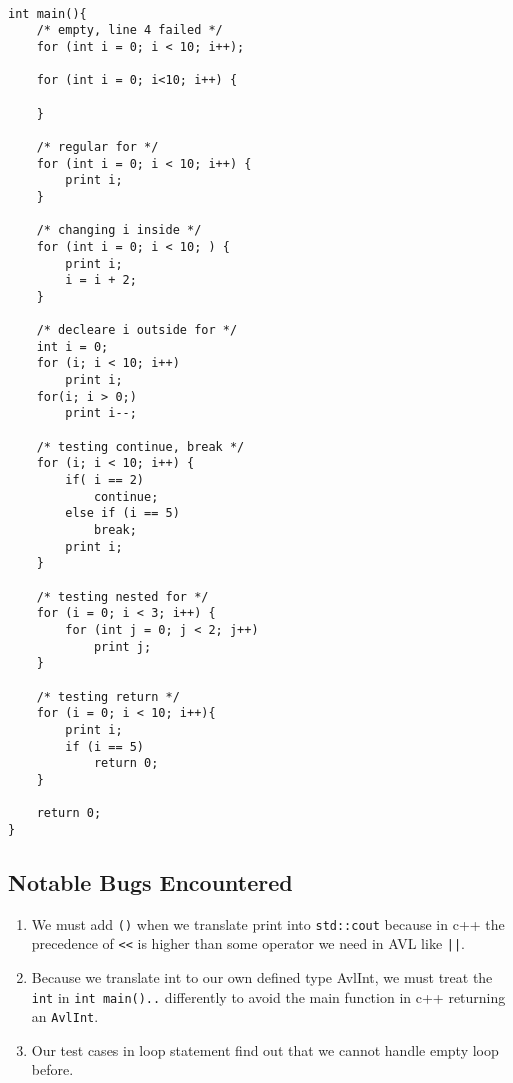 \begin{verbatim}

int main(){
    /* empty, line 4 failed */
    for (int i = 0; i < 10; i++);

    for (int i = 0; i<10; i++) {

    }

    /* regular for */
    for (int i = 0; i < 10; i++) {
        print i;
    }

    /* changing i inside */
    for (int i = 0; i < 10; ) {
        print i;
        i = i + 2;
    }

    /* decleare i outside for */
    int i = 0;
    for (i; i < 10; i++)
        print i;
    for(i; i > 0;)
        print i--;

    /* testing continue, break */
    for (i; i < 10; i++) {
        if( i == 2)
            continue;
        else if (i == 5)
            break;
        print i;
    }

    /* testing nested for */
    for (i = 0; i < 3; i++) {
        for (int j = 0; j < 2; j++)
            print j;
    }

    /* testing return */
    for (i = 0; i < 10; i++){ 
        print i;
        if (i == 5)
            return 0;
    }

    return 0;
}
\end{verbatim}

\subsection{Notable Bugs Encountered}

\begin{enumerate}
\item We must add \verb"()" when we translate print into \verb"std::cout" because in c++ the
precedence of \verb"<<" is higher than some operator we need in AVL like \verb"||".
\item Because we translate int to our own defined type AvlInt, we must treat the \verb"int" in
\verb"int main().." differently to avoid the main function in c++ returning an \verb"AvlInt".
\item Our test cases in loop statement find out that we cannot handle empty loop before.
\end{enumerate}

